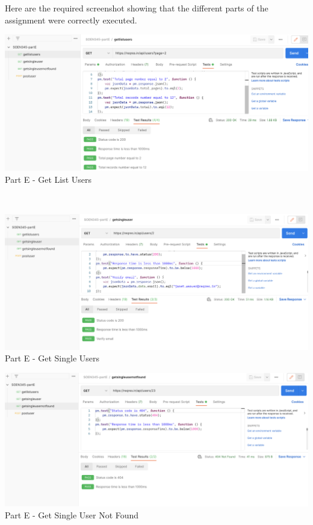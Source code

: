 \newpage
\noindent Here are the required screenshot showing that the different parts of the assignment were correctly executed.

\begin{center}
    \includegraphics[width=1\textwidth]{img/partE-1.png}
    \noindent Part E - Get List Users
\end{center}
\noindent \\
\begin{center}
    \includegraphics[width=1\textwidth]{img/partE-2.png}
    \noindent Part E - Get Single Users
\end{center}
\newpage
\begin{center}
    \includegraphics[width=1\textwidth]{img/partE-3.png}
    \noindent Part E - Get Single User Not Found
\end{center}

